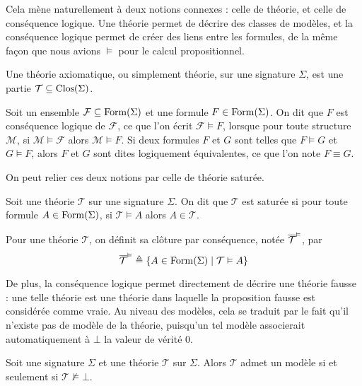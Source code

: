 Cela mène naturellement à deux notions connexes : celle de théorie, et celle
de conséquence logique. Une théorie permet de décrire des classes de modèles, et
la conséquence logique permet de créer des liens entre les formules, de la même
façon que nous avions $\vDash$ pour le calcul propositionnel.

\begin{definition}[Théorie]
  Une théorie axiomatique, ou simplement théorie, sur une signature $\Sigma$,
  est une partie $\mathcal T\subseteq\operatorname{Clos}(\Sigma)$.
\end{definition}

\begin{definition}
  Soit un ensemble $\mathcal F \subseteq \operatorname{Form}(\Sigma)$ et une formule
  $F\in\operatorname{Form}(\Sigma)$. On dit que $F$ est conséquence logique de
  $\mathcal F$, ce que l'on écrit $\mathcal F \vDash F$, lorsque pour toute
  structure $\mathcal M$, si $\mathcal M\models \mathcal F$ alors
  $\mathcal M\models F$. Si deux formules $F$ et $G$ sont telles que
  $F\vDash G$ et $G\vDash F$, alors $F$ et $G$ sont dites logiquement
  équivalentes, ce que l'on note $F\equiv G$.
\end{definition}

On peut relier ces deux notions par celle de théorie saturée.

\begin{definition}
  Soit une théorie $\mathcal T$ sur une signature $\Sigma$. On dit que
  $\mathcal T$ est saturée si pour toute formule $A\in\operatorname{Form}(\Sigma)$,
  si $\mathcal T\vDash A$ alors $A\in \mathcal T$.

  Pour une théorie $\mathcal T$, on définit sa clôture par conséquence, notée
  $\overline{\mathcal T}^{\vDash}$, par
  \[\overline{\mathcal T}^{\vDash} \triangleq \{ A \in \operatorname{Form}(\Sigma)
  \mid \mathcal T \vDash A\}\]
\end{definition}

De plus, la conséquence logique permet directement de décrire une théorie
\og fausse\fg{} : une telle théorie est une théorie dans laquelle la proposition
fausse est considérée comme vraie. Au niveau des modèles, cela se traduit par le
fait qu'il n'existe pas de modèle de la théorie, puisqu'un tel modèle
associerait automatiquement à $\bot$ la valeur de vérité $0$.

\begin{proposition}
  Soit une signature $\Sigma$ et une théorie $\mathcal T$ sur $\Sigma$. Alors
  $\mathcal T$ admet un modèle si et seulement si $\mathcal T \not\vDash \bot$.
\end{proposition}

